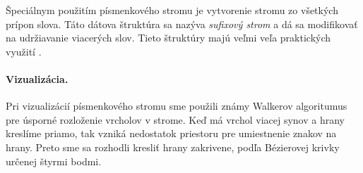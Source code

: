 Špeciálnym použitím písmenkového stromu je vytvorenie stromu zo všetkých 
prípon slova. Táto dátova štruktúra sa nazýva \emph{sufixový strom} a dá sa 
mo\-di\-fi\-ko\-vať na udržiavanie viacerých slov. Tieto štruktúry majú 
veľmi veľa praktických využití \citep{gusfield}. 

\paragraph{Vizualizácia.} Pri vizualizácií písmenkového stromu sme použili 
známy Walkerov algoritumus pre úsporné rozloženie vrcholov v strome. 
\citep{walker} Keď má vrchol viacej synov a hrany kreslíme priamo, tak vzniká 
nedostatok priestoru pre umiestnenie znakov na hrany. Preto sme sa rozhodli 
kresliť hrany zakrivene, podľa Bézierovej krivky určenej štyrmi bodmi.

